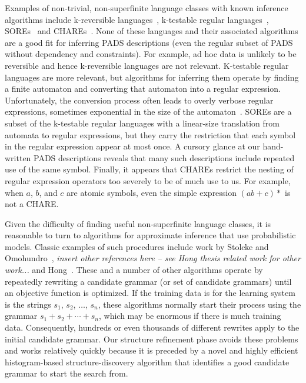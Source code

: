 Examples of non-trivial, non-superfinite
language classes with known inference algorithms include
k-reversible languages~\cite{angluin:revesible-language-inference},
k-testable regular languages~\cite{garcia+:k-testable-languages},
SOREs~\cite{bex+:dtd-inference} and CHAREs~\cite{bex+:dtd-inference}.
None of these languages and their associated algorithms 
are a good fit for inferring PADS descriptions (even the
regular subset of PADS without dependency and constraints).  
For example, ad hoc data is unlikely to be reversible and hence
k-reversible languages are not relevant.  K-testable regular languages are
more relevant, but algorithms for inferring them
operate by finding a finite automaton and converting that 
automaton into a regular expression.  Unfortunately, the conversion process
often leads to overly verbose regular expressions, sometimes 
exponential in the size of the automaton~\cite{bex+:dtd-inference}. 
SOREs are a subset of the k-testable
regular languages with a linear-size translation from automata to
regular expressions, but they carry the restriction that each symbol
in the regular expression appear at most once.  A cursory glance at
our hand-written PADS descriptions reveals that many such descriptions
include repeated use of the same symbol.  Finally, it appears that
CHAREs restrict the nesting of regular expression operators too severely to 
be of much use to us.  For example, when $a$, $b$, and $c$ are atomic symbols,
even the simple expression $(ab + c)*$ is not a CHARE.

Given the difficulty of finding useful non-superfinite language classes,
it is reasonable to turn to algorithms for approximate
inference that use probabilistic models.    
Classic examples of such procedures include work by Stolcke and
Omohundro~\cite{stolcke94inducing}, {\em insert other references here -- see Hong thesis related work for other work...} and 
Hong~\cite{hong01using,hong:thesis}.  These and a number of other algorithms
operate by repeatedly rewriting a candidate grammar (or set of candidate
grammars) until an objective function is optimized.
If the training data is for the learning system is the strings
$s_1$, $s_2$, $\ldots$, $s_n$, these algorithms normally start their
process using the grammar $s_1 + s_2 + \cdots + s_n$, which may
be enormous if there is much training data.  
Consequently, hundreds or even thousands of different rewrites apply to the
initial candidate grammar.  Our structure refinement
phase avoids these problems and works relatively quickly 
because it is preceded by a novel and highly efficient
histogram-based structure-discovery algorithm 
that identifies a good candidate grammar to start the search from.  


